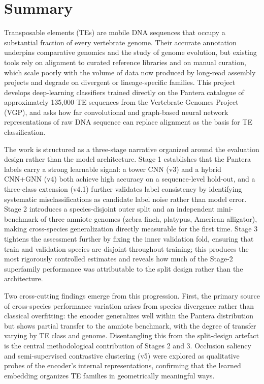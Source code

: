 \documentclass[12pt]{article}
\begin{document}
\newpage
\section*{Summary}

Transposable elements (TEs) are mobile DNA sequences that occupy a substantial fraction of every vertebrate genome. Their accurate annotation underpins comparative genomics and the study of genome evolution, but existing tools rely on alignment to curated reference libraries and on manual curation, which scale poorly with the volume of data now produced by long-read assembly projects and degrade on divergent or lineage-specific families. This project develops deep-learning classifiers trained directly on the Pantera catalogue of approximately 135{,}000 TE sequences from the Vertebrate Genomes Project (VGP), and asks how far convolutional and graph-based neural network representations of raw DNA sequence can replace alignment as the basis for TE classification.

The work is structured as a three-stage narrative organized around the evaluation design rather than the model architecture. Stage 1 establishes that the Pantera labels carry a strong learnable signal: a tower CNN (v3) and a hybrid CNN+GNN (v4) both achieve high accuracy on a sequence-level hold-out, and a three-class extension (v4.1) further validates label consistency by identifying systematic misclassifications as candidate label noise rather than model error. Stage 2 introduces a species-disjoint outer split and an independent mini-benchmark of three amniote genomes (zebra finch, platypus, American alligator), making cross-species generalization directly measurable for the first time. Stage 3 tightens the assessment further by fixing the inner validation fold, ensuring that train and validation species are disjoint throughout training; this produces the most rigorously controlled estimates and reveals how much of the Stage-2 superfamily performance was attributable to the split design rather than the architecture.

Two cross-cutting findings emerge from this progression. First, the primary source of cross-species performance variation arises from species divergence rather than classical overfitting: the encoder generalizes well within the Pantera distribution but shows partial transfer to the amniote benchmark, with the degree of transfer varying by TE class and genome. Disentangling this from the split-design artefact is the central methodological contribution of Stages 2 and 3. Occlusion saliency and semi-supervised contrastive clustering (v5) were explored as qualitative probes of the encoder's internal representations, confirming that the learned embedding organizes TE families in geometrically meaningful ways.
\end{document}
